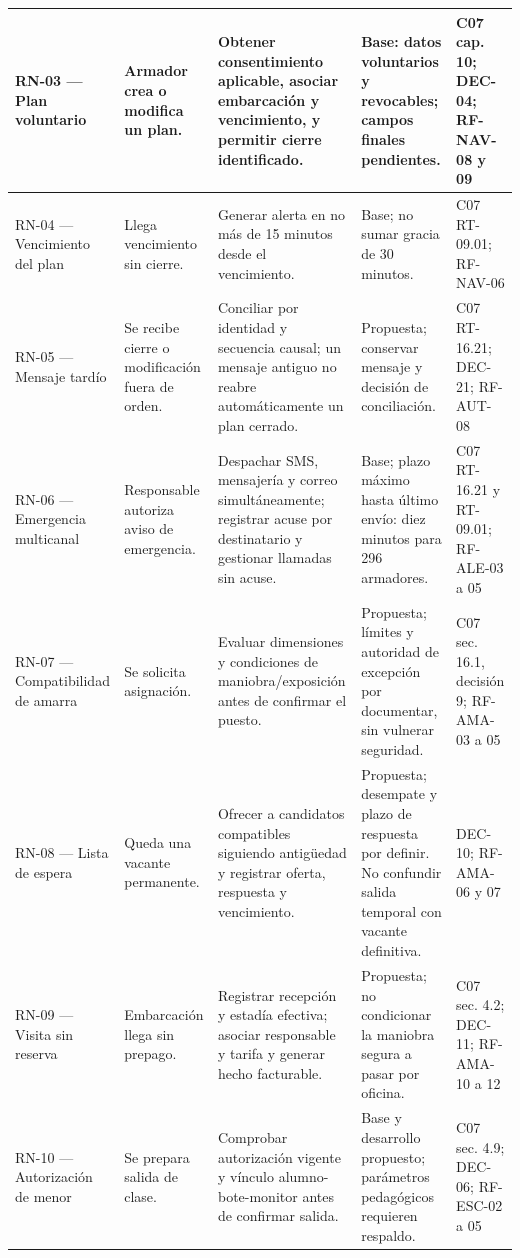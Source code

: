 \begin{longtable}{|L{0.116466\AnchoTablaAnexo}|L{0.160643\AnchoTablaAnexo}|L{0.325301\AnchoTablaAnexo}|L{0.257028\AnchoTablaAnexo}|L{0.140562\AnchoTablaAnexo}|}
RN-03 — Plan voluntario & Armador crea o modifica un plan. & Obtener consentimiento aplicable, asociar embarcación y vencimiento, y permitir cierre identificado. & Base: datos voluntarios y revocables; campos finales pendientes. & C07 cap. 10; DEC-04; RF-NAV-08 y 09 \\ \hline
RN-04 — Vencimiento del plan & Llega vencimiento sin cierre. & Generar alerta en no más de 15 minutos desde el vencimiento. & Base; no sumar gracia de 30 minutos. & C07 RT-09.01; RF-NAV-06 \\ \hline
{}
RN-05 — Mensaje tardío & Se recibe cierre o modificación fuera de orden. & Conciliar por identidad y secuencia causal; un mensaje antiguo no reabre automáticamente un plan cerrado. & Propuesta; conservar mensaje y decisión de conciliación. & C07 RT-16.21; DEC-21; RF-AUT-08 \\ \hline
RN-06 — Emergencia multicanal & Responsable autoriza aviso de emergencia. & Despachar SMS, mensajería y correo simultáneamente; registrar acuse por destinatario y gestionar llamadas sin acuse. & Base; plazo máximo hasta último envío: diez minutos para 296 armadores. & C07 RT-16.21 y RT-09.01; RF-ALE-03 a 05 \\ \hline
{}
RN-07 — Compatibilidad de amarra & Se solicita asignación. & Evaluar dimensiones y condiciones de maniobra/exposición antes de confirmar el puesto. & Propuesta; límites y autoridad de excepción por documentar, sin vulnerar seguridad. & C07 sec. 16.1, decisión 9; RF-AMA-03 a 05 \\ \hline
RN-08 — Lista de espera & Queda una vacante permanente. & Ofrecer a candidatos compatibles siguiendo antigüedad y registrar oferta, respuesta y vencimiento. & Propuesta; desempate y plazo de respuesta por definir. No confundir salida temporal con vacante definitiva. & DEC-10; RF-AMA-06 y 07 \\ \hline
{}
RN-09 — Visita sin reserva & Embarcación llega sin prepago. & Registrar recepción y estadía efectiva; asociar responsable y tarifa y generar hecho facturable. & Propuesta; no condicionar la maniobra segura a pasar por oficina. & C07 sec. 4.2; DEC-11; RF-AMA-10 a 12 \\ \hline
RN-10 — Autorización de menor & Se prepara salida de clase. & Comprobar autorización vigente y vínculo alumno-bote-monitor antes de confirmar salida. & Base y desarrollo propuesto; parámetros pedagógicos requieren respaldo. & C07 sec. 4.9; DEC-06; RF-ESC-02 a 05 \\ \hline

\end{longtable}
